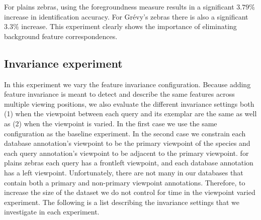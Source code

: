         For plains zebras, using the foregroundness measure results in a significant $3.79\percent$ increase in
          identification accuracy.
        For Grévy's zebras there is also a significant  $3.3\percent$ increase.
        This experiment clearly shows the importance of eliminating background feature correspondences.
     
    \subsection{Invariance experiment}\label{sub:exptinvar}  
        In this experiment we vary the feature invariance configuration.
        Because adding feature invariance is meant to detect and describe the same features across multiple
          viewing positions, we also evaluate the different invariance settings both
        (1) when the viewpoint between each query and its \groundtrue{} exemplar are the same as well as
        (2) when the viewpoint is varied.
        In the first case we use the same \timectrl{} configuration as the baseline experiment.
        In the second case we constrain each database annotation's viewpoint to be the primary viewpoint of the
          species and each query annotation's viewpoint to be adjacent to the primary viewpoint.
        \Eg{} for plains zebras each query has a frontleft viewpoint, and each database annotation has a left
          viewpoint.
        Unfortunately, there are not many \names{} in our databases that contain both a primary and non-primary
          viewpoint annotations.
        Therefore, to increase the size of the dataset we do not control for time in the viewpoint varied
          experiment.
        The following is a list describing the invariance settings that we investigate in each experiment.

